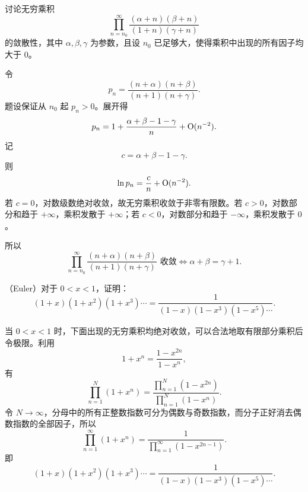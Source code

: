 \begin{xexercise}[5]
讨论无穷乘积
\[
\prod_{n=n_0}^{\infty}\frac{(\alpha+n)(\beta+n)}{(1+n)(\gamma+n)}
\]
的敛散性，其中 $\alpha,\beta,\gamma$ 为参数，且设 $n_0$ 已足够大，使得乘积中出现的所有因子均大于 0。
\end{xexercise}
\begin{xsolution}
令
\[
 p_n=\frac{(n+\alpha)(n+\beta)}{(n+1)(n+\gamma)}.
\]
题设保证从 $n_0$ 起 $p_n>0$。展开得
\[
 p_n
 =1+\frac{\alpha+\beta-1-\gamma}{n}+\mathrm{O}(n^{-2}).
\]
记
\[
 c=\alpha+\beta-1-\gamma.
\]
则
\[
 \ln p_n=\frac c n+\mathrm{O}(n^{-2}).
\]
若 $c=0$，对数级数绝对收敛，故无穷乘积收敛于非零有限数。若 $c>0$，对数部分和趋于 $+\infty$，乘积发散于 $+\infty$；若 $c<0$，对数部分和趋于 $-\infty$，乘积发散于 $0$。

所以
\[
 \boxed{\prod_{n=n_0}^{\infty}\frac{(n+\alpha)(n+\beta)}{(n+1)(n+\gamma)}
 \text{ 收敛}\Longleftrightarrow \alpha+\beta=\gamma+1.}
\]
\end{xsolution}


\begin{xexercise}[6]
（Euler）对于 $0<x<1$，证明：
\[
(1+x)(1+x^2)(1+x^3)\cdots=\frac1{(1-x)(1-x^3)(1-x^5)\cdots}.
\]
\end{xexercise}
\begin{xsolution}
当 $0<x<1$ 时，下面出现的无穷乘积均绝对收敛，可以合法地取有限部分乘积后令极限。利用
\[
 1+x^n=\frac{1-x^{2n}}{1-x^n},
\]
有
\[
 \prod_{n=1}^{N}(1+x^n)
 =\frac{\prod_{n=1}^{N}(1-x^{2n})}{\prod_{n=1}^{N}(1-x^n)}.
\]
令 $N\to\infty$，分母中的所有正整数指数可分为偶数与奇数指数，而分子正好消去偶数指数的全部因子，所以
\[
 \prod_{n=1}^{\infty}(1+x^n)
 =\frac1{\prod_{n=1}^{\infty}(1-x^{2n-1})}.
\]
即
\[
 \boxed{(1+x)(1+x^2)(1+x^3)\cdots
 =\frac1{(1-x)(1-x^3)(1-x^5)\cdots}.}
\]
\end{xsolution}


